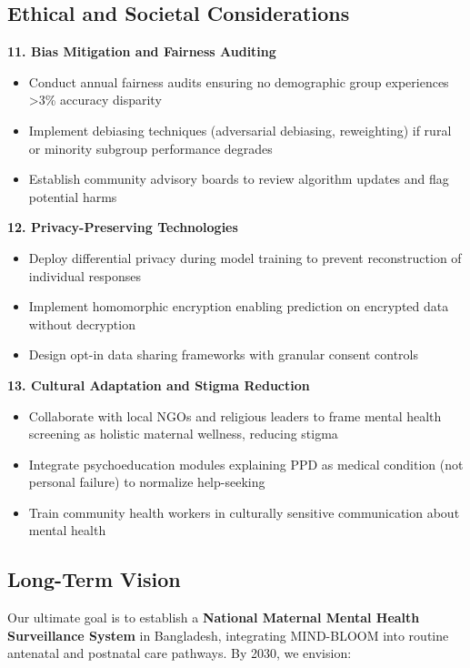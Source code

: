 \subsection{Ethical and Societal Considerations}

\textbf{11. Bias Mitigation and Fairness Auditing}
\begin{itemize}
    \item Conduct annual fairness audits ensuring no demographic group experiences >3\% accuracy disparity
    \item Implement debiasing techniques (adversarial debiasing, reweighting) if rural or minority subgroup performance degrades
    \item Establish community advisory boards to review algorithm updates and flag potential harms
\end{itemize}

\textbf{12. Privacy-Preserving Technologies}
\begin{itemize}
    \item Deploy differential privacy during model training to prevent reconstruction of individual responses
    \item Implement homomorphic encryption enabling prediction on encrypted data without decryption
    \item Design opt-in data sharing frameworks with granular consent controls
\end{itemize}

\textbf{13. Cultural Adaptation and Stigma Reduction}
\begin{itemize}
    \item Collaborate with local NGOs and religious leaders to frame mental health screening as holistic maternal wellness, reducing stigma
    \item Integrate psychoeducation modules explaining PPD as medical condition (not personal failure) to normalize help-seeking
    \item Train community health workers in culturally sensitive communication about mental health
\end{itemize}

\subsection{Long-Term Vision}

Our ultimate goal is to establish a \textbf{National Maternal Mental Health Surveillance System} in Bangladesh, integrating MIND-BLOOM into routine antenatal and postnatal care pathways. By 2030, we envision:

